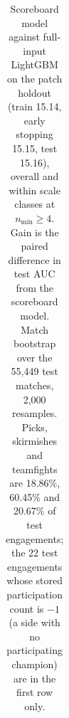 \begin{table}[t]
\centering
\caption{Scoreboard model against full-input LightGBM on the patch holdout (train 15.14, early stopping
15.15, test 15.16), overall and within scale classes at $n_{\min} \ge 4$. Gain is the paired difference in
test AUC from the scoreboard model. Match bootstrap over the 55,449 test matches, 2,000 resamples. Picks,
skirmishes and teamfights are 18.86\%, 60.45\% and 20.67\% of test engagements; the 22 test engagements
whose stored participation count is $-1$ (a side with no participating champion) are in the first row
only.}
\label{tab:pred-scoreboard}
\scriptsize
\setlength{\tabcolsep}{3.5pt}
\begin{tabular}{@{}lrccccc@{}}

\end{tabular}
\end{table}
